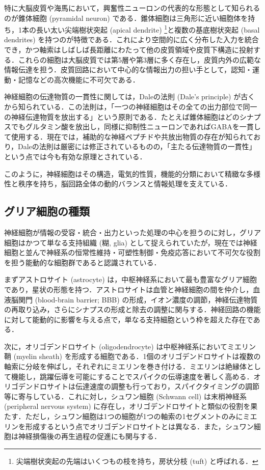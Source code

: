 \documentclass[titlepage]{ltjsbook}
\begin{document}
特に大脳皮質や海馬において，興奮性ニューロンの代表的な形態として知られるのが錐体細胞 (pyramidal neuron) である．錐体細胞は三角形に近い細胞体を持ち，1本の長い太い尖端樹状突起 (apical dendrite) \footnote{尖端樹状突起の先端はいくつもの枝を持ち，房状分枝 (tuft) と呼ばれる．}と複数の基底樹状突起 (basal dendrites) を持つのが特徴である．これにより空間的に広く分布した入力を統合でき，かつ軸索はしばしば長距離にわたって他の皮質領域や皮質下構造に投射する．これらの細胞は大脳皮質では第5層や第3層に多く存在し，皮質内外の広範な情報伝達を担う．皮質回路において中心的な情報出力の担い手として，認知・運動・記憶などの高次機能に不可欠である．

神経細胞の伝達物質の一貫性に関しては，Daleの法則 (Dale's principle) が古くから知られている．この法則は，「一つの神経細胞はその全ての出力部位で同一の神経伝達物質を放出する」という原則である．たとえば錐体細胞はどのシナプスでもグルタミン酸を放出し，同様に抑制性ニューロンであればGABAを一貫して使用する．現在では，補助的な神経ペプチドや共放出物質の存在が知られており，Daleの法則は厳密には修正されているものの，「主たる伝達物質の一貫性」という点では今も有効な原理とされている．

このように，神経細胞はその構造，電気的性質，機能的分類において精緻な多様性と秩序を持ち，脳回路全体の動的バランスと情報処理を支えている．

\subsection{グリア細胞の種類}
神経細胞が情報の受容・統合・出力といった処理の中心を担うのに対し，グリア細胞はかつて単なる支持組織 (糊, glia) として捉えられていたが，現在では神経細胞と並んで神経系の恒常性維持・可塑性制御・免疫応答において不可欠な役割を担う能動的な細胞群であると認識されている．

まずアストロサイト (astrocyte) は，中枢神経系において最も豊富なグリア細胞であり，星状の形態を持つ．アストロサイトは血管と神経細胞の間を仲介し，血液脳関門 (blood-brain barrier; BBB) の形成，イオン濃度の調節，神経伝達物質の再取り込み，さらにシナプスの形成と除去の調整に関与する．神経回路の機能に対して能動的に影響を与える点で，単なる支持細胞という枠を超えた存在である．

次に，オリゴデンドロサイト (oligodendrocyte) は中枢神経系においてミエリン鞘 (myelin sheath) を形成する細胞である．1個のオリゴデンドロサイトは複数の軸索に分岐を伸ばし，それぞれにミエリンを巻き付ける．ミエリンは絶縁体として機能し，跳躍伝導を可能にすることでスパイクの伝導速度を著しく高める．オリゴデンドロサイトは伝達速度の調整も行っており，スパイクタイミングの調節等に寄与している．これに対し，シュワン細胞 (Schwann cell) は末梢神経系 (peripheral nervous system) に存在し，オリゴデンドロサイトと類似の役割を果たす．ただし，シュワン細胞は1つの細胞が1つの軸索の1セグメントのみにミエリンを形成するという点でオリゴデンドロサイトとは異なる．また，シュワン細胞は神経損傷後の再生過程の促進にも関与する．
\end{document}
